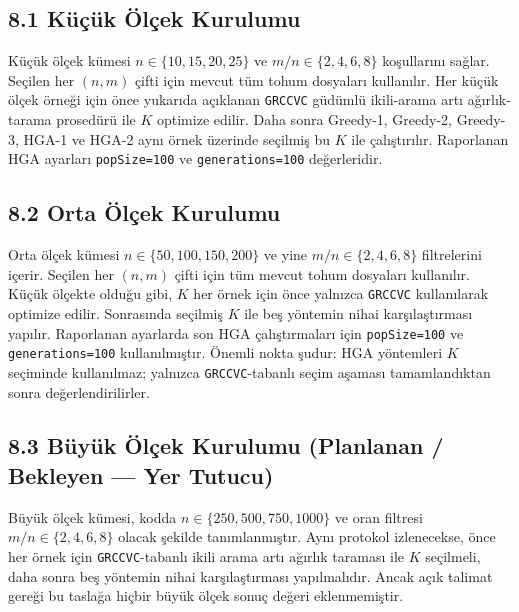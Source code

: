 \documentclass[11pt]{article}
\begin{document}
\subsection*{8.1 Küçük Ölçek Kurulumu}

Küçük ölçek kümesi \(n\in\{10,15,20,25\}\) ve \(m/n\in\{2,4,6,8\}\) koşullarını sağlar. Seçilen her \((n,m)\) çifti için mevcut tüm tohum dosyaları kullanılır. Her küçük ölçek örneği için önce yukarıda açıklanan \texttt{GRCCVC} güdümlü ikili-arama artı ağırlık-tarama prosedürü ile \(K\) optimize edilir. Daha sonra Greedy-1, Greedy-2, Greedy-3, HGA-1 ve HGA-2 aynı örnek üzerinde seçilmiş bu \(K\) ile çalıştırılır. Raporlanan HGA ayarları \texttt{popSize=100} ve \texttt{generations=100} değerleridir.

\subsection*{8.2 Orta Ölçek Kurulumu}

Orta ölçek kümesi \(n\in\{50,100,150,200\}\) ve yine \(m/n\in\{2,4,6,8\}\) filtrelerini içerir. Seçilen her \((n,m)\) çifti için tüm mevcut tohum dosyaları kullanılır. Küçük ölçekte olduğu gibi, \(K\) her örnek için önce yalnızca \texttt{GRCCVC} kullanılarak optimize edilir. Sonrasında seçilmiş \(K\) ile beş yöntemin nihai karşılaştırması yapılır. Raporlanan ayarlarda son HGA çalıştırmaları için \texttt{popSize=100} ve \texttt{generations=100} kullanılmıştır. Önemli nokta şudur: HGA yöntemleri \(K\) seçiminde kullanılmaz; yalnızca \texttt{GRCCVC}-tabanlı seçim aşaması tamamlandıktan sonra değerlendirilirler.

\subsection*{8.3 Büyük Ölçek Kurulumu (Planlanan / Bekleyen --- Yer Tutucu)}

Büyük ölçek kümesi, kodda \(n\in\{250,500,750,1000\}\) ve oran filtresi \(m/n\in\{2,4,6,8\}\) olacak şekilde tanımlanmıştır. Aynı protokol izlenecekse, önce her örnek için \texttt{GRCCVC}-tabanlı ikili arama artı ağırlık taraması ile \(K\) seçilmeli, daha sonra beş yöntemin nihai karşılaştırması yapılmalıdır. Ancak açık talimat gereği bu taslağa hiçbir büyük ölçek sonuç değeri eklenmemiştir.
\end{document}
